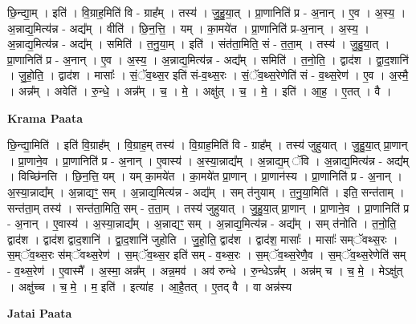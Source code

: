 \documentclass[17pt]{extarticle}
\begin{document}
छि॒न्द्या॒म् । इति॑ । वि॒ग्राह॒मिति॑ वि - ग्राह᳚म् । तस्य॑ । जु॒हु॒या॒त् । प्रा॒णानिति॑ प्र - अ॒नान् । ए॒व । अ॒स्य॒ । अ॒न्नाद्य॒मित्य॑न्न - अद्य᳚म् । वीति॑ । छि॒न॒त्ति॒ । यम् । का॒मये॑त । प्रा॒णानिति॑ प्र-अ॒नान् । अ॒स्य॒ । अ॒न्नाद्य॒मित्य॑न्न - अद्य᳚म् । समिति॑ । त॒नु॒या॒म् । इति॑ । संत॑ता॒मिति॒ सं - त॒ता॒म् । तस्य॑ । जु॒हु॒या॒त् । प्रा॒णानिति॑ प्र - अ॒नान् । ए॒व । अ॒स्य॒ । अ॒न्नाद्य॒मित्य॑न्न - अद्य᳚म् । समिति॑ । त॒नो॒ति॒ । द्वाद॑श । द्वा॒द॒शानि॑ । जु॒हो॒ति॒ । द्वाद॑श । मासाः᳚ । सं॒ॅव॒थ्स॒र इति॑ सं-व॒थ्स॒रः । सं॒ॅव॒थ्स॒रेणेति॑ सं - व॒थ्स॒रेण॑ । ए॒व । अ॒स्मै॒ । अन्न᳚म् । अवेति॑ । रु॒न्धे॒ । अन्न᳚म् । च॒ । मे॒ । अक्षु॑त् । च॒ । मे॒ । इति॑ । आ॒ह॒ । ए॒तत् । वै ।  \newline


\textbf{Krama Paata} \newline

छि॒न्द्या॒मिति॑ । इति॑ वि॒ग्राह᳚म् । वि॒ग्राह॒म् तस्य॑ । वि॒ग्राह॒मिति॑ वि - ग्राह᳚म् । तस्य॑ जुहुयात् । जु॒हु॒या॒त् प्रा॒णान् । प्रा॒णाने॒व । प्रा॒णानिति॑ प्र - अ॒नान् । ए॒वास्य॑ । अ॒स्या॒न्नाद्य᳚म् । अ॒न्नाद्य॒म् ॅवि । अ॒न्नाद्य॒मित्य॑न्न - अद्य᳚म् । विच्छि॑नत्ति । छि॒न॒त्ति॒ यम् । यम् का॒मये॑त । का॒मये॑त प्रा॒णान् । प्रा॒णान॑स्य । प्रा॒णानिति॑ प्र - अ॒नान् । अ॒स्या॒न्नाद्य᳚म् । अ॒न्नाद्यꣳ॒॒ सम् । अ॒न्नाद्य॒मित्य॑न्न - अद्य᳚म् । सम् त॑नुयाम् । त॒नु॒या॒मिति॑ । इति॒ सन्त॑ताम् । सन्त॑ता॒म् तस्य॑ । सन्त॑ता॒मिति॒ सम् - त॒ता॒म् । तस्य॑ जुहुयात् । जु॒हु॒या॒त् प्रा॒णान् । प्रा॒णाने॒व । प्रा॒णानिति॑ प्र - अ॒नान् । ए॒वास्य॑ । अ॒स्या॒न्नाद्य᳚म् । अ॒न्नाद्यꣳ॒॒ सम् । अ॒न्नाद्य॒मित्य॑न्न - अद्य᳚म् । सम् त॑नोति । त॒नो॒ति॒ द्वाद॑श । द्वाद॑श द्वाद॒शानि॑ । द्वा॒द॒शानि॑ जुहोति । जु॒हो॒ति॒ द्वाद॑श । द्वाद॑श॒ मासाः᳚ । मासाः᳚ सम्ॅवथ्स॒रः । स॒म्ॅव॒थ्स॒रः स॑म्ॅवथ्स॒रेण॑ । स॒म्ॅव॒थ्स॒र इति॑ सम् - व॒थ्स॒रः । स॒म्ॅव॒थ्स॒रेणै॒व । स॒म्ॅव॒थ्स॒रेणेति॑ सम् - व॒थ्स॒रेण॑ । ए॒वास्मै᳚ । अ॒स्मा॒ अन्न᳚म् । अन्न॒मव॑ । अव॑ रुन्धे । रु॒न्धेऽन्न᳚म् । अन्न॑म् च । च॒ मे॒ । मेऽक्षु॑त् । अक्षु॑च्च । च॒ मे॒ । म॒ इति॑ । इत्या॑ह । आ॒है॒तत् । ए॒तद् वै । वा अन्न॑स्य \newline

\textbf{Jatai Paata} \newline
\end{document}
